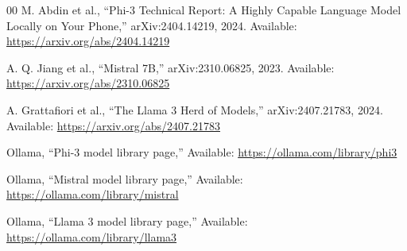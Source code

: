 \documentclass[conference]{IEEEtran}
\begin{document}
\begin{thebibliography}{00}
M. Abdin et al., ``Phi-3 Technical Report: A Highly Capable Language Model Locally on Your Phone,'' arXiv:2404.14219, 2024. Available: \url{https://arxiv.org/abs/2404.14219}

A. Q. Jiang et al., ``Mistral 7B,'' arXiv:2310.06825, 2023. Available: \url{https://arxiv.org/abs/2310.06825}

A. Grattafiori et al., ``The Llama 3 Herd of Models,'' arXiv:2407.21783, 2024. Available: \url{https://arxiv.org/abs/2407.21783}

Ollama, ``Phi-3 model library page,'' Available: \url{https://ollama.com/library/phi3}

Ollama, ``Mistral model library page,'' Available: \url{https://ollama.com/library/mistral}

Ollama, ``Llama 3 model library page,'' Available: \url{https://ollama.com/library/llama3}

\end{thebibliography}
\end{document}

